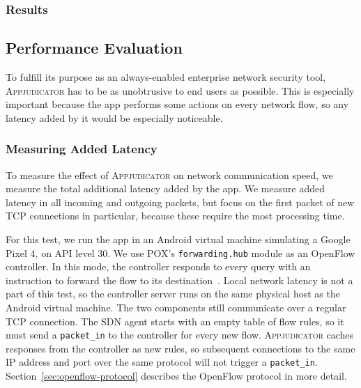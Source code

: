 \subsubsection{Results}
\label{sec:practical-results}


\subsection{Performance Evaluation}
\label{sec:performance-evaluation}

To fulfill its purpose as an always-enabled enterprise network security tool,
\textsc{Appjudicator} has to be as unobtrusive to end users as possible. This is
especially important because the app performs some actions on every network
flow, so any latency added by it would be especially noticeable.

\subsubsection{Measuring Added Latency}
\label{sec:measuring-added-latency}

To measure the effect of \textsc{Appjudicator} on network communication speed,
we measure the total additional latency added by the app. We measure added
latency in all incoming and outgoing packets, but focus on the first packet of
new TCP connections in particular, because these require the most processing
time.

For this test, we run the app in an Android virtual machine simulating a Google
Pixel 4, on API level 30. We use POX's \texttt{forwarding.hub} module as an
OpenFlow controller. In this mode, the controller responds to every query with
an instruction to forward the flow to its destination~\cite{mccauley2015}. Local
network latency is not a part of this test, so the controller server runs on the
same physical host as the Android virtual machine. The two components still
communicate over a regular TCP connection. The SDN agent starts with an empty
table of flow rules, so it must send a \texttt{packet\_in} to the controller for
every new flow. \textsc{Appjudicator} caches responses from the controller as
new rules, so subsequent connections to the same IP address and port over the
same protocol will not trigger a \texttt{packet\_in}.
Section~\ref{sec:openflow-protocol} describes the OpenFlow protocol in more
detail.

